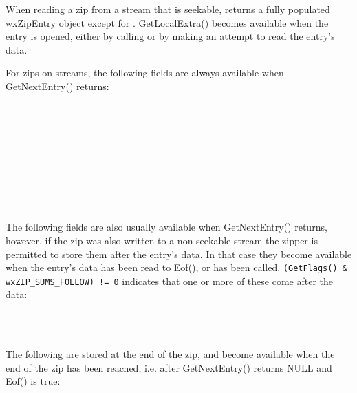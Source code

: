 
When reading a zip from a stream that is seekable,
  returns
a fully populated wxZipEntry object except for
 . GetLocalExtra()
becomes available when the entry is opened, either by calling
  or by
making an attempt to read the entry's data.

For zips on  streams, the following
fields are always available when GetNextEntry() returns:

\\
\\
\\
\\
\\
\\
\\
\\

The following fields are also usually available when GetNextEntry()
returns, however, if the zip was also written to a non-seekable stream
the zipper is permitted to store them after the entry's data. In that
case they become available when the entry's data has been read to Eof(),
or  has been called.
{\tt (GetFlags() \& wxZIP\_SUMS\_FOLLOW) != 0} indicates that one or
more of these come after the data:

\\
\\

The following are stored at the end of the zip, and become available
when the end of the zip has been reached, i.e. after GetNextEntry()
returns NULL and Eof() is true:

\\
\\
\\
\\
\\
\\
\\


